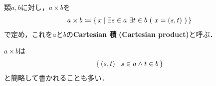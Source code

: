 	\begin{screen}
		\begin{dfn}[Cartesian積]
			類$a,b$に対し，$a \times b$を
			\begin{align}
				a \times b \coloneqq \left\{\, x \mid \exists s \in a\ \exists t \in b\ (\ x=(s,t)\ )\, \right\}
			\end{align}
			で定め，これを$a$と$b$の{\bf Cartesian 積}
			{\bf (Cartesian product)}と呼ぶ．
		\end{dfn}
	\end{screen}
	
	$a \times b$は
	\begin{align}
		\left\{\, (s,t) \mid s \in a \wedge t \in b\, \right\} 
	\end{align}
	と簡略して書かれることも多い．
	
	\begin{comment}
	\monologue{
		院生「類$a$と類$b$のCartesian 積は
			\begin{align}
				a \times b = \Set{(s,t)}{s \in a \wedge t \in b} 
			\end{align}
			と簡略して書かれることも多いです．ところで他の本やネットなどを見ていると
			Cartesian 積を直積とも呼んでいるそうです．本稿でも後で直積というものを定義いたしますが，
			本稿ではCartesian 積と直積を明確に区別いたします．
			これは巷にあふれる直積の定義の不自然さを解消するためです．
			どういう点が不自然であるか簡単に説明いたしましょう．
			まだ有限とか数だとか定義していませんが，説明の便宜のために使用いたします．
			よく見る直積の定義だと，有限か有限でないかで直積の定め方が変わります．
			\begin{align}
				I_1 \times I_2 \times \cdots \times I_n 
				= \Set{(x_1,x_2,\cdots,x_n)}{x_1 \in I_1 \wedge x_2 \in I_2 \wedge
				\cdots \wedge x_n \in I_n}
			\end{align}
			そして
			\begin{align}
				I_1 \times I_2 \times \cdots \times I_n 
				= \prod_{i=1}^n I_i
			\end{align}
			と書いている．ここで
			$\prod_{i=1}^n I_i$は$\prod_{i\in\{1,2,\cdots,n\}} I_i$の別の記法です．
			他方$I$を$\{1,2,\cdots,n\}$から$V$への写像と見ることもできますから
			\begin{align}
				\prod_{i=1}^n I_i = \Set{f}{f:\{1,2,\cdots,n\} \longrightarrow V \wedge \forall i \in \{1,2,\cdots,n\}\ (\ f(i) \in I_i\ )}
			\end{align}
			となるはずです．食い違います．
			」
	}
	\end{comment}
	

